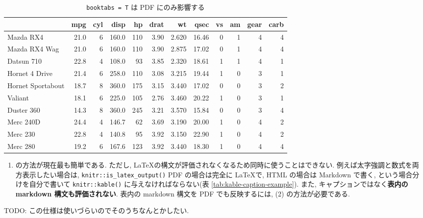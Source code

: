 \documentclass[
  xelatex,ja=standard,jafont=noto]{bxjsbook}
\providecommand{\tightlist}{%
  \setlength{\itemsep}{0pt}\setlength{\parskip}{0pt}}
\theoremstyle{definition}
\theoremstyle{definition}
\theoremstyle{definition}
\theoremstyle{definition}
\theoremstyle{remark}
\begin{document}
\begin{table}

\caption{\label{tab:display-dataframe-kable-booktabs}\texttt{booktabs = T} は PDF にのみ影響する
}
\centering
\begin{tabular}[t]{lrrrrrrrrrrr}
\toprule
  & mpg & cyl & disp & hp & drat & wt & qsec & vs & am & gear & carb\\
\midrule
Mazda RX4 & 21.0 & 6 & 160.0 & 110 & 3.90 & 2.620 & 16.46 & 0 & 1 & 4 & 4\\
Mazda RX4 Wag & 21.0 & 6 & 160.0 & 110 & 3.90 & 2.875 & 17.02 & 0 & 1 & 4 & 4\\
Datsun 710 & 22.8 & 4 & 108.0 & 93 & 3.85 & 2.320 & 18.61 & 1 & 1 & 4 & 1\\
Hornet 4 Drive & 21.4 & 6 & 258.0 & 110 & 3.08 & 3.215 & 19.44 & 1 & 0 & 3 & 1\\
Hornet Sportabout & 18.7 & 8 & 360.0 & 175 & 3.15 & 3.440 & 17.02 & 0 & 0 & 3 & 2\\
\addlinespace
Valiant & 18.1 & 6 & 225.0 & 105 & 2.76 & 3.460 & 20.22 & 1 & 0 & 3 & 1\\
Duster 360 & 14.3 & 8 & 360.0 & 245 & 3.21 & 3.570 & 15.84 & 0 & 0 & 3 & 4\\
Merc 240D & 24.4 & 4 & 146.7 & 62 & 3.69 & 3.190 & 20.00 & 1 & 0 & 4 & 2\\
Merc 230 & 22.8 & 4 & 140.8 & 95 & 3.92 & 3.150 & 22.90 & 1 & 0 & 4 & 2\\
Merc 280 & 19.2 & 6 & 167.6 & 123 & 3.92 & 3.440 & 18.30 & 1 & 0 & 4 & 4\\
\bottomrule
\end{tabular}
\end{table}

\begin{enumerate}
\def\labelenumi{(\arabic{enumi})}
\tightlist
\item
  の方法が現在最も簡単である. ただし,
  \LaTeX の構文が評価されなくなるため同時に使うことはできない.
  例えば太字強調と数式を両方表示したい場合は,
  \texttt{knitr::is\_latex\_output()} PDF の場合は完全に \LaTeX で, HTML
  の場合は Markdown で書く, という場合分けを自分で書いて
  \texttt{knitr::kable()} に与えなければならない(表
  \ref{tab:kable-caption-example}). また,
  キャプションではなく\textbf{表内の markdown 構文も評価されない}.
  表内の markdown 構文を PDF でも反映するには, (2) の方法が必要である.
\end{enumerate}

TODO: この仕様は使いづらいのでそのうちなんとかしたい.
\end{document}
